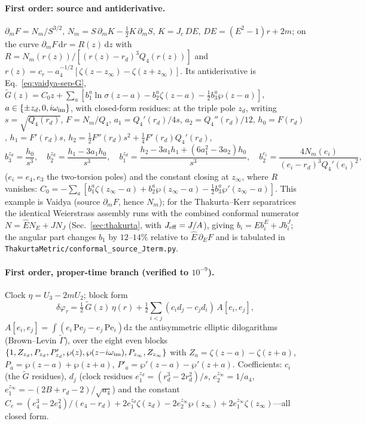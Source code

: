 \documentclass[12pt]{iopart}
\newcommand{\Ehat}{\hat E}
\newcommand{\Jc}{J_{c}}
\newcommand{\dd}{\mathrm{d}}
\begin{document}
\paragraph{First order: source and antiderivative.}
$\partial_m F=N_m/S^{3/2}$, $N_m=S\,\partial_mK-\tfrac12K\,\partial_mS$, $K=\Jc\,DE$,
$DE=(E^2-1)r+2m$; on the curve $\partial_m F\,\dd r=R(z)\,\dd z$ with
$R=N_m(r(z))/[(r(z)-r_d)^3Q_4(r(z))]$ and $r(z)=c_r-a_4^{-1/2}[\zeta(z-z_\infty)-
\zeta(z+z_\infty)]$. Its antiderivative is Eq.~\eqref{eq:vaidya-sep-G},
$\tilde G(z)=C_0 z+\sum_{a}[b_1^a\ln\sigma(z-a)-b_2^a\zeta(z-a)-\tfrac12 b_3^a
\wp(z-a)]$, $a\in\{\pm z_d,0,i\omega_{\rm im}\}$, with closed-form residues: at the
triple pole $z_d$, writing $s=\sqrt{Q_4(r_d)}$, $F=N_m/Q_4$, $a_1=Q_4'(r_d)/4s$,
$a_2=Q_4''(r_d)/12$, $h_0=F(r_d)$, $h_1=F'(r_d)s$,
$h_2=\tfrac12F''(r_d)s^2+\tfrac14F'(r_d)Q_4'(r_d)$,
\begin{equation}
b_3^{z_d}=\frac{h_0}{s^3},\quad b_2^{z_d}=\frac{h_1-3a_1h_0}{s^3},\quad
b_1^{z_d}=\frac{h_2-3a_1h_1+(6a_1^2-3a_2)h_0}{s^3},\quad
b_2^{e_i}=\frac{4N_m(e_i)}{(e_i-r_d)^3Q_4'(e_i)^2},
\end{equation}
($e_i=e_4,e_3$ the two-torsion poles) and the constant closing at $z_\infty$, where
$R$ vanishes: $C_0=-\sum_a[b_1^a\zeta(z_\infty-a)+b_2^a\wp(z_\infty-a)-\tfrac12
b_3^a\wp'(z_\infty-a)]$. This example is Vaidya (source $\partial_m F$, hence
$N_m$); for the Thakurta--Kerr separatrices the identical Weierstrass assembly runs
with the combined conformal numerator $N=\Ehat N_E+J N_J$ (Sec.~\ref{sec:thakurta},
with $J_{\rm eff}=J/A$), giving $b_i=\Ehat b_i^{E}+J b_i^{J}$; the
angular part changes $b_1$ by $12$--$14\%$ relative to $\Ehat\,\partial_E F$ and is tabulated in
\texttt{ThakurtaMetric/conformal\_source\_Jterm.py}.

\paragraph{First order, proper-time branch (verified to $10^{-9}$).}
Clock $\eta=U_3-2mU_2$; block form
\begin{equation}
\delta\varphi_\tau=\tfrac12\,\tilde G(z)\,\eta(r)
+\tfrac12\sum_{i<j}(c_i d_j-c_j d_i)\,A[e_i,e_j],
\end{equation}
$A[e_i,e_j]=\int(e_i\,\mathrm{Pe}_j-e_j\,\mathrm{Pe}_i)\dd z$ the antisymmetric
elliptic dilogarithms (Brown--Levin $\tilde\Gamma$), over the eight even blocks
$\{1,Z_{z_d},P_{z_d},P'_{z_d},\wp(z),\wp(z{-}i\omega_{\rm im}),P_{z_\infty},
Z_{z_\infty}\}$ with $Z_a=\zeta(z{-}a)-\zeta(z{+}a)$,
$P_a=\wp(z{-}a)+\wp(z{+}a)$, $P'_a=\wp'(z{-}a)-\wp'(z{+}a)$. Coefficients: $c_i$ (the
$\tilde G$ residues), $d_j$ (clock residues $e_1^{z_d}=(r_d^3-2r_d^2)/s$,
$e_2^{z_\infty}=1/a_4$, $e_1^{z_\infty}=-(2B+r_d-2)/\sqrt{a_4}$) and the constant
$C_e=(e_4^3-2e_4^2)/(e_4-r_d)+2e_1^{z_d}\zeta(z_d)-2e_2^{z_\infty}\wp(z_\infty)
+2e_1^{z_\infty}\zeta(z_\infty)$---all closed form.
\end{document}
